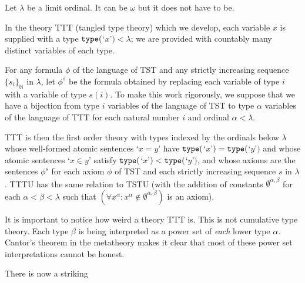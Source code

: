 \documentclass[112pt]{article}
\theoremstyle{definition}
\theoremstyle{remark}
\begin{document}
Let $\lambda$ be a limit ordinal.  It can be $\omega$ but it does not have to be.

In the theory TTT (tangled type theory) which we develop, each variable $x$ is supplied with a type ${\tt type}($`$x$'$) <\lambda$;  we are provided with countably many distinct variables of each type.

For any formula $\phi$ of the language of TST and any strictly increasing sequence $\{s_i\}_{\mathbb N}$ in $\lambda$, let $\phi^s$ be the formula obtained by replacing each variable
of type $i$ with a variable of type $s(i)$.  To make this work rigorously, we suppose that we have a bijection from type $i$ variables of the language of TST to type $\alpha$ variables
of the language of TTT for each natural number $i$ and ordinal $\alpha<\lambda$.



TTT is then the first order theory with types indexed by the ordinals below $\lambda$ whose well-formed atomic sentences `$x=y$' have ${\tt type}($`$x$'$) = {\tt type}($`$y$'$)$ and whose atomic sentences `$x \in y$' satisfy ${\tt type}($`$x$'$) < {\tt type}($`$y$'$)$, and whose axioms are the sentences $\phi^s$ for each axiom $\phi$ of TST and each strictly increasing sequence $s$ in $\lambda$.  TTTU has the same relation to TSTU (with the addition of constants $\emptyset^{\alpha,\beta}$ for each $\alpha<\beta<\lambda$  such that $(\forall x^{\alpha} :x^{\alpha}\not\in \emptyset^{\alpha,\beta})$ is an axiom).



It is important to notice how weird a theory TTT is.  This is not cumulative type theory.  Each type $\beta$ is being interpreted as a power set of {\em each\/} lower type $\alpha$.  Cantor's theorem in the metatheory makes it clear that most of these power set interpretations cannot be honest.

There is now a striking
\end{document}
